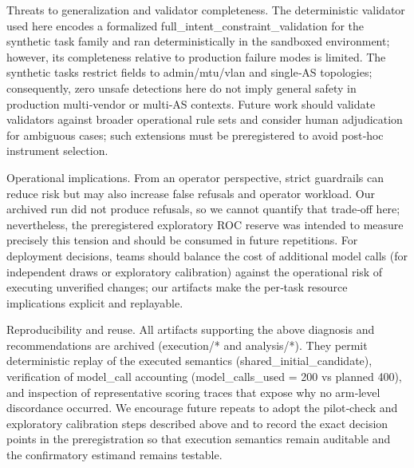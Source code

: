 \documentclass[conference]{IEEEtran}
\begin{document}
Threats to generalization and validator completeness. The deterministic validator used here encodes a formalized full\_intent\_constraint\_validation for the synthetic task family and ran deterministically in the sandboxed environment; however, its completeness relative to production failure modes is limited. The synthetic tasks restrict fields to admin/mtu/vlan and single‑AS topologies; consequently, zero unsafe detections here do not imply general safety in production multi‑vendor or multi‑AS contexts. Future work should validate validators against broader operational rule sets and consider human adjudication for ambiguous cases; such extensions must be preregistered to avoid post‑hoc instrument selection.

Operational implications. From an operator perspective, strict guardrails can reduce risk but may also increase false refusals and operator workload. Our archived run did not produce refusals, so we cannot quantify that trade‑off here; nevertheless, the preregistered exploratory ROC reserve was intended to measure precisely this tension and should be consumed in future repetitions. For deployment decisions, teams should balance the cost of additional model calls (for independent draws or exploratory calibration) against the operational risk of executing unverified changes; our artifacts make the per‑task resource implications explicit and replayable.

Reproducibility and reuse. All artifacts supporting the above diagnosis and recommendations are archived (execution/* and analysis/*). They permit deterministic replay of the executed semantics (shared\_initial\_candidate), verification of model\_call accounting (model\_calls\_used = 200 vs planned 400), and inspection of representative scoring traces that expose why no arm‑level discordance occurred. We encourage future repeats to adopt the pilot‑check and exploratory calibration steps described above and to record the exact decision points in the preregistration so that execution semantics remain auditable and the confirmatory estimand remains testable.
\end{document}
